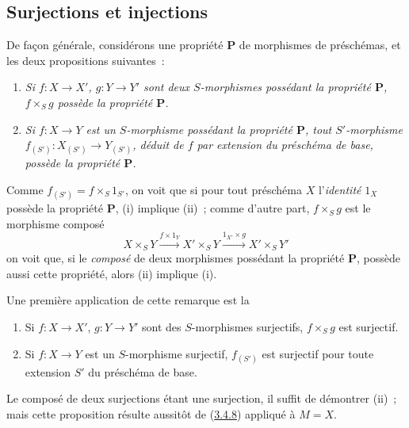 \subsection{Surjections et injections}
\label{subsection:I.3.5-fr}

\begin{env}[3.5.1]
\label{I.3.5.1-fr}
De façon générale, considérons une propriété $\boldsymbol{P}$ de morphismes de
préschémas, et les deux propositions suivantes~:
\begin{enumerate}
  \item[(i)] \itshape Si $f:X\to X'$, $g:Y\to Y'$ sont deux $S$-morphismes possédant
  la propriété $\boldsymbol{P}$, $f\times_S g$ possède la propriété $\boldsymbol{P}$.
  \upshape\item[(ii)] \itshape Si $f:X\to Y$ est un $S$-morphisme possédant la propriété
  $\boldsymbol{P}$, tout $S'$-morphisme $f_{(S')}:X_{(S')}\to Y_{(S')}$, déduit
  de $f$ par extension du préschéma de base, possède la propriété
  $\boldsymbol{P}$.
\end{enumerate}

Comme $f_{(S')}=f\times_S 1_{S'}$, on voit que si pour tout préschéma $X$
l'\emph{identité} $1_X$ possède la propriété $\boldsymbol{P}$, (i) implique
(ii)~; comme d'autre part, $f\times_S g$ est le morphisme composé
\label{I.3.5.1.product-composition-fr}
\[
  X\times_S Y\xrightarrow{f\times 1_Y}X'\times_S Y
  \xrightarrow{1_{X'}\times g}X'\times_S Y'
\]
on voit que, si le \emph{composé} de deux morphismes possédant la propriété
$\boldsymbol{P}$, possède aussi cette propriété, alors (ii) implique (i).
\end{env}

Une première application de cette remarque est la

\begin{proposition}[3.5.2]
\label{I.3.5.2-fr}
\begin{enumerate}
  \item[(i)] Si $f:X\to X'$, $g:Y\to Y'$ sont des $S$-morphismes surjectifs,
  $f\times_S g$ est surjectif.
  \item[(ii)] Si $f:X\to Y$ est un $S$-morphisme surjectif, $f_{(S')}$ est
  surjectif pour toute extension $S'$ du préschéma de base.
\end{enumerate}
\end{proposition}

Le composé de deux surjections étant une surjection, il suffit de démontrer
(ii)~; mais cette proposition résulte aussitôt de
(\hyperref[I.3.4.8-fr]{3.4.8}) appliqué à $M=X$.

